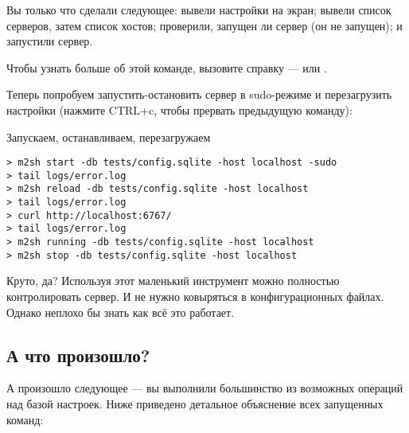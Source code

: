 Вы только что сделали следующее: вывели настройки на экран; вывели
список серверов, затем список хостов; проверили, запущен ли сервер
(он не запущен); и запустили сервер.

Чтобы узнать больше об этой команде, вызовите справку ---  или .

Теперь попробуем запустить-остановить сервер в sudo-режиме и
перезагрузить настройки (нажмите CTRL+c, чтобы прервать предыдущую
команду):

\begin{code}{Запускаем, останавливаем, перезагружаем}
\begin{lstlisting}
> m2sh start -db tests/config.sqlite -host localhost -sudo
> tail logs/error.log
> m2sh reload -db tests/config.sqlite -host localhost
> tail logs/error.log
> curl http://localhost:6767/
> tail logs/error.log
> m2sh running -db tests/config.sqlite -host localhost
> m2sh stop -db tests/config.sqlite -host localhost
\end{lstlisting}
\end{code}

Круто, да? Используя этот маленький инструмент можно полностью
контролировать сервер. И не нужно ковыряться в конфигурационных
файлах. Однако неплохо бы знать как всё это работает.

\subsection{А что произошло?}

А произошло следующее --- вы выполнили большинство из возможных
операций над базой настроек. Ниже приведено детальное
объяснение всех запущенных команд:

